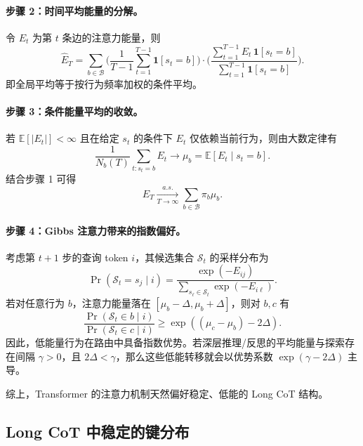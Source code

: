 \paragraph{步骤 2：时间平均能量的分解。}
令 $E_t$ 为第 $t$ 条边的注意力能量，则
\begin{equation}
\widehat{E}_T = \sum_{b\in\mathcal{B}} \Big( \frac{1}{T-1}\sum_{t=1}^{T-1}\mathbf{1}[s_t=b] \Big) \cdot \Big( \frac{\sum_{t=1}^{T-1} E_t\, \mathbf{1}[s_t=b]}{\sum_{t=1}^{T-1}\mathbf{1}[s_t=b]} \Big).
\end{equation}
即全局平均等于按行为频率加权的条件平均。\vspace{-5pt}

\paragraph{步骤 3：条件能量平均的收敛。}
若 $\mathbb{E}[|E_t|]<\infty$ 且在给定 $s_t$ 的条件下 $E_t$ 仅依赖当前行为，则由大数定律有
\begin{equation}
\frac{1}{N_b(T)}\sum_{t:s_t=b} E_t \to \mu_b = \mathbb{E}[E_t\mid s_t=b].
\end{equation}
结合步骤 1 可得
\begin{equation}
\widehat{E}_T \xrightarrow[T\to\infty]{a.s.} \sum_{b\in\mathcal{B}} \pi_b \mu_b.
\end{equation}
\vspace{-5pt}
\paragraph{步骤 4：Gibbs 注意力带来的指数偏好。}
考虑第 $t+1$ 步的查询 token $i$，其候选集合 $\mathcal{S}_t$ 的采样分布为
\begin{equation}
\Pr(\mathcal{S}_t=s_j \mid i) = \frac{\exp(-E_{ij})}{\sum_{s_\ell\in\mathcal{S}_t}\exp(-E_{i\ell})}.
\end{equation}
若对任意行为 $b$，注意力能量落在 $[\mu_b-\Delta, \mu_b+\Delta]$，则对 $b,c$ 有
\begin{equation}
\frac{\Pr(\mathcal{S}_t \in b \mid i)}{\Pr(\mathcal{S}_t \in c \mid i)} \ge \exp((\mu_c-\mu_b)-2\Delta).
\end{equation}
因此，低能量行为在路由中具备指数优势。若深层推理/反思的平均能量与探索存在间隔 $\gamma>0$，且 $2\Delta<\gamma$，那么这些低能转移就会以优势系数 $\exp(\gamma-2\Delta)$ 主导。

综上，Transformer 的注意力机制天然偏好稳定、低能的 Long CoT 结构。


\subsection{Long CoT 中稳定的键分布}
\label{append:stable-bond}
